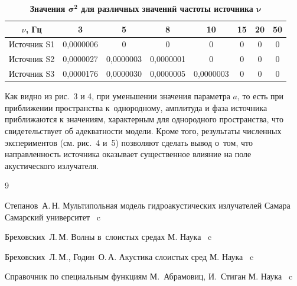 \begin{table}[h!]
\centering
\begin{minipage}[t]{128mm}
\caption {\bf Значения $\boldsymbol{\sigma^2}$ для различных значений частоты
источника $\boldsymbol\nu$}\vspace{-3mm}
\begin{tabular}{c|c|c|c|c|c|c|c}
\hline
$\nu$,  Гц  & 3           & 5           & 8           & 10          & 15 & 20 & 50\\
\hline
Источник S1 & 0{,}0000006 & 0           & 0           & 0           & 0  & 0  & 0\\
Источник S2 & 0{,}0000027 & 0{,}0000003 & 0{,}0000001 & 0           & 0  & 0  & 0\\
Источник S3 & 0{,}0000176 & 0{,}0000030 & 0{,}0000005 & 0{,}0000003 & 0  & 0  & 0\\
\hline
\end{tabular}
\end{minipage}
\end{table}








{} Как видно из рис.~3 и 4, при уменьшении
значения параметра $a$,  то есть при приближении пространства к~однородному,
амплитуда и фаза источника приближаются к
значениям,  характерным для однородного пространства,  что
свидетельствует об адекватности модели. Кроме того,  результаты
численных экспериментов (см. рис.~4 и~5) позволяют сделать вывод о~том,
что направленность источника оказывает существенное влияние на
поле акустического излучателя.

\begin{thebibliography}{9}

\by Степанов~А.\,Н.
\book Мультипольная модель гидроакустических излучателей
\publaddr Самара
\publ Самарский университет
~c

\by Бреховских~Л.\,М.
\book Волны в~слоистых средах
\publaddr М.
\publ Наука
~c

\by Бреховских~Л.\,М.,  Годин~О.\,А.
\book Акустика слоистых сред
\publaddr М.
\publ Наука
~c


\book Справочник по специальным функциям
\ed М.~Абрамовиц,  И.~Стиган
\publaddr М.
\publ Наука
~c
\end{thebibliography}



\makeengtitlem

%
%
% 
